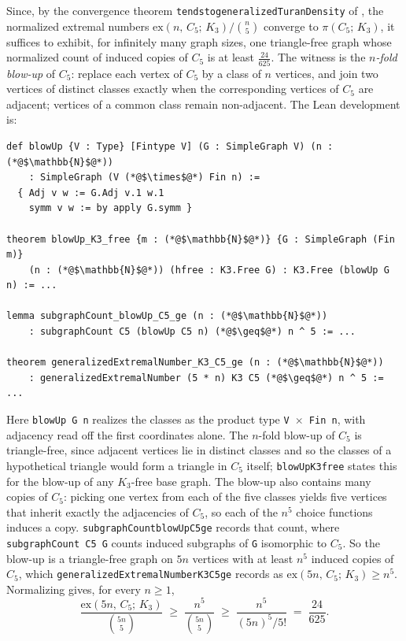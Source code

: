 \documentclass[acmsmall,screen=true,acmthm=false]{acmart}
\newcommand{\tdensity}[2]{\pi(#1;\,#2)}
\DeclareRobustCommand{\lean}[1]{{\def\_{\textunderscore\allowbreak}\texttt{#1}}}
\begin{document}
Since, by the convergence theorem
\lean{tendsto\_\allowbreak generalizedTuranDensity} of ,
the normalized extremal numbers $\mathrm{ex}(n,\,C_5;\,K_3)/\binom{n}{5}$
converge to $\tdensity{C_5}{K_3}$, it suffices to exhibit, for infinitely many
graph sizes, one triangle-free graph whose normalized count of induced copies of
$C_5$ is at least $\tfrac{24}{625}$.  The
witness is the \emph{$n$-fold blow-up} of $C_5$: replace each vertex of
$C_5$ by a class of $n$ vertices, and join two vertices of distinct
classes exactly when the corresponding vertices of $C_5$ are adjacent;
vertices of a common class remain non-adjacent.  The Lean development is:
\begin{lstlisting}
def blowUp {V : Type} [Fintype V] (G : SimpleGraph V) (n : (*@$\mathbb{N}$@*))
    : SimpleGraph (V (*@$\times$@*) Fin n) :=
  { Adj v w := G.Adj v.1 w.1
    symm v w := by apply G.symm }

theorem blowUp_K3_free {m : (*@$\mathbb{N}$@*)} {G : SimpleGraph (Fin m)}
    (n : (*@$\mathbb{N}$@*)) (hfree : K3.Free G) : K3.Free (blowUp G n) := ...

lemma subgraphCount_blowUp_C5_ge (n : (*@$\mathbb{N}$@*))
    : subgraphCount C5 (blowUp C5 n) (*@$\geq$@*) n ^ 5 := ...

theorem generalizedExtremalNumber_K3_C5_ge (n : (*@$\mathbb{N}$@*))
    : generalizedExtremalNumber (5 * n) K3 C5 (*@$\geq$@*) n ^ 5 := ...
\end{lstlisting}
Here \lean{blowUp G n} realizes the classes as the product type
\lean{V $\times$ Fin n}, with adjacency read off the first coordinates alone.
The $n$-fold blow-up of $C_5$ is triangle-free, since adjacent vertices lie in
distinct classes and so the classes of a hypothetical triangle would form a
triangle in $C_5$ itself; \lean{blowUp\_K3\_free} states this for the blow-up
of any $K_3$-free base graph.  The blow-up also contains many copies of $C_5$:
picking one vertex from each of the five classes yields five vertices that
inherit exactly the adjacencies of $C_5$, so each of the $n^5$ choice
functions induces a copy.  \lean{subgraphCount\_blowUp\_C5\_ge} records that
count, where \lean{subgraphCount C5 G} counts induced subgraphs of \lean{G}
isomorphic to $C_5$.  So the blow-up is a triangle-free graph on $5n$ vertices
with at least $n^5$
induced copies of $C_5$, which
\lean{generalizedExtremalNumber\_K3\_C5\_ge} records as
$\mathrm{ex}(5n,\,C_5;\,K_3)\geq n^5$.  Normalizing gives, for every $n\geq1$,
\[
  \frac{\mathrm{ex}(5n,\,C_5;\,K_3)}{\binom{5n}{5}}
  \;\geq\;
  \frac{n^5}{\binom{5n}{5}}
  \;\geq\;
  \frac{n^5}{(5n)^5 / 5!}
  \;=\;
  \frac{24}{625}.
\]
\end{document}
